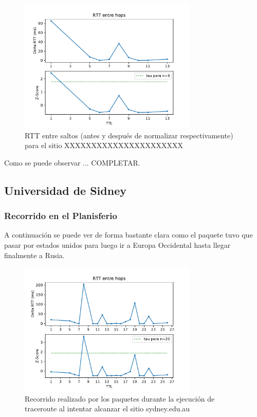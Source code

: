 \begin{figure}[H]
  \centering
  \includegraphics[width=8.5cm]{figs/traceroute-saopaulo.pdf}
  \caption{\normalfont RTT entre saltos (antes y después de normalizar respectivamente) para el sitio XXXXXXXXXXXXXXXXXXXXXX}
\end{figure}

Como se puede observar ... COMPLETAR.


\subsection*{Universidad de Sidney}

\subsubsection*{Recorrido en el Planisferio}

A continuación se puede ver de forma bastante clara como el paquete tuvo que pasar por estados unidos para luego ir a Europa Occidental hasta llegar finalmente a Rusia.

\begin{figure}[H]
  \centering
  \includegraphics[width=8.5cm]{figs/traceroute-sidney.pdf}
  \caption{\normalfont Recorrido realizado por los paquetes durante la ejecución de traceroute al intentar alcanzar el sitio sydney.edu.au}
\end{figure}

